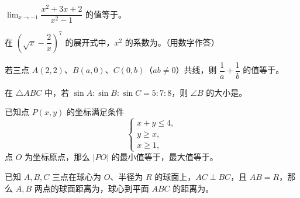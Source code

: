 \begin{question}
$\displaystyle\lim_{x\to-1}\dfrac{x^2+3x+2}{x^2-1}$ 的值等于\gkblank{}。

\end{question}
\begin{question}
在 $\left(\sqrt{x}-\dfrac2x\right)^7$ 的展开式中，$x^2$ 的系数为\gkblank{}。（用数字作答）

\end{question}
\begin{question}
若三点 $A(2,2)$、$B(a,0)$、$C(0,b)$（$ab\ne0$）共线，则 $\dfrac1a+\dfrac1b$ 的值等于\gkblank{}。

\end{question}
\begin{question}
在 $\triangle ABC$ 中，若 $\sin A:\sin B:\sin C=5:7:8$，则 $\angle B$ 的大小是\gkblank{}。

\end{question}
\begin{question}
已知点 $P(x,y)$ 的坐标满足条件
\nopagebreak[4]
\[
\begin{cases}
x+y\le 4,\\
y\ge x,\\
x\ge 1,
\end{cases}
\]
点 $O$ 为坐标原点，那么 $|PO|$ 的最小值等于\gkblank{}，最大值等于\gkblank{}。

\end{question}
\begin{question}
已知 $A,B,C$ 三点在球心为 $O$、半径为 $R$ 的球面上，$AC\perp BC$，且 $AB=R$，那么 $A,B$ 两点的球面距离为\gkblank{}，球心到平面 $ABC$ 的距离为\gkblank{}。

\end{question}

